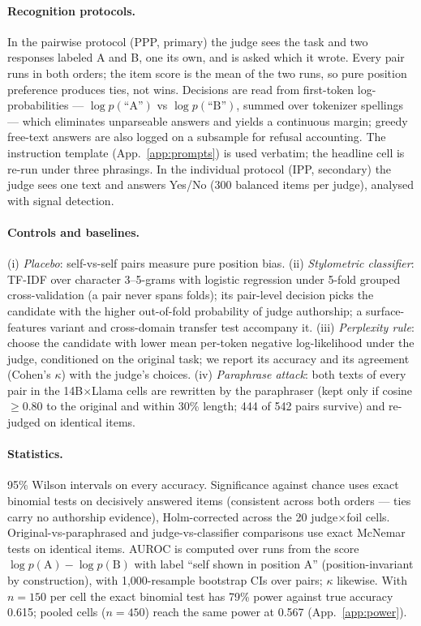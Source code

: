 \documentclass[11pt]{article}
\begin{document}
\paragraph{Recognition protocols.}
In the pairwise protocol (PPP, primary) the judge sees the task and two
responses labeled A and B, one its own, and is asked which it wrote. Every
pair runs in both orders; the item score is the mean of the two runs, so
pure position preference produces ties, not wins. Decisions are read from
first-token log-probabilities --- $\log p(\text{``A''})$ vs
$\log p(\text{``B''})$, summed over tokenizer spellings --- which
eliminates unparseable answers and yields a continuous margin; greedy
free-text answers are also logged on a subsample for refusal accounting.
The instruction template (App.~\ref{app:prompts}) is used verbatim; the
headline cell is re-run under three phrasings. In the individual protocol
(IPP, secondary) the judge sees one text and answers Yes/No (300 balanced
items per judge), analysed with signal detection.

\paragraph{Controls and baselines.}
(i) \emph{Placebo}: self-vs-self pairs measure pure position bias.
(ii) \emph{Stylometric classifier}: TF-IDF over character 3--5-grams with
logistic regression under 5-fold grouped cross-validation (a pair never
spans folds); its pair-level decision picks the candidate with the higher
out-of-fold probability of judge authorship; a surface-features variant
and cross-domain transfer test accompany it. (iii) \emph{Perplexity rule}:
choose the candidate with lower mean per-token negative log-likelihood
under the judge, conditioned on the original task; we report its accuracy
and its agreement (Cohen's $\kappa$) with the judge's choices.
(iv) \emph{Paraphrase attack}: both texts of every pair in the
14B$\times$Llama cells are rewritten by the paraphraser (kept only if
cosine $\geq 0.80$ to the original and within 30\% length; 444 of 542
pairs survive) and re-judged on identical items.

\paragraph{Statistics.}
95\% Wilson intervals on every accuracy. Significance against chance uses
exact binomial tests on decisively answered items (consistent across both
orders --- ties carry no authorship evidence), Holm-corrected across the
20 judge$\times$foil cells. Original-vs-paraphrased and
judge-vs-classifier comparisons use exact McNemar tests on identical
items. AUROC is computed over runs from the score
$\log p(\text{A}) - \log p(\text{B})$ with label ``self shown in position
A'' (position-invariant by construction), with 1{,}000-resample bootstrap
CIs over pairs; $\kappa$ likewise. With $n{=}150$ per cell the exact
binomial test has 79\% power against true accuracy 0.615; pooled cells
($n{=}450$) reach the same power at 0.567 (App.~\ref{app:power}).
\end{document}
